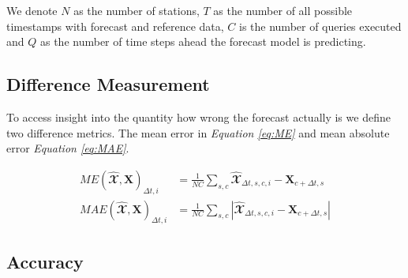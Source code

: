 \documentclass{article}
\theoremstyle{plain}
\theoremstyle{definition}
\theoremstyle{remark}
\begin{document}
We denote $N$ as the number of stations, $T$ as the number of all possible timestamps with forecast and reference data, $C$ is the number of queries executed and $Q$ as the number of time steps ahead the forecast model is predicting.   


\subsection{Difference Measurement}\label{sec:mean}
To access insight into the quantity how wrong the forecast actually is we define two difference metrics. The mean error in \textit{Equation \ref{eq:ME}} and mean absolute error \textit{Equation \ref{eq:MAE}}.

\begin{align}
    ME(\hat{\mathbfcal{X}}, \textbf{X})_{\Delta t, i} &=   \frac{1}{N C} \sum_{s, c} \hat{\mathbfcal{X}}_{\Delta t, s, c, i} - \textbf{X}_{c + \Delta t, s}
    \label{eq:ME} \\
    MAE(\hat{\mathbfcal{X}}, \textbf{X})_{\Delta t, i} &=   \frac{1}{N C} \sum_{s, c} |\hat{\mathbfcal{X}}_{\Delta t, s, c, i} - \textbf{X}_{c + \Delta t, s}|
    \label{eq:MAE}
\end{align}






\subsection{Accuracy}\label{sec:accuracy}
\end{document}
